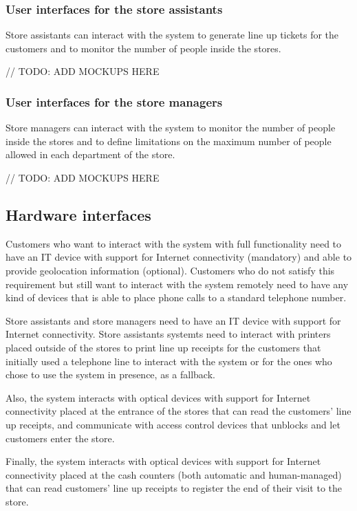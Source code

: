 \documentclass[../../main.tex]{subfiles}
\begin{document}
  \subsubsection{User interfaces for the store assistants}

  Store assistants can interact with the system to generate line up tickets for the customers and to monitor the number of people inside the stores.

  // TODO: ADD MOCKUPS HERE

  \subsubsection{User interfaces for the store managers}

  Store managers can interact with the system to monitor the number of people inside the stores and to define limitations on the maximum number of people allowed in each department of the store.

  // TODO: ADD MOCKUPS HERE

\subsection{Hardware interfaces}

Customers who want to interact with the system with full functionality need to have an IT device with support for Internet connectivity (mandatory) and able to provide geolocation information (optional). Customers who do not satisfy this requirement but still want to interact with the system remotely need to have any kind of devices that is able to place phone calls to a standard telephone number.

Store assistants and store managers need to have an IT device with support for Internet connectivity. Store assistants systemts need to interact with printers placed outside of the stores to print line up receipts for the customers that initially used a telephone line to interact with the system or for the ones who chose to use the system in presence, as a fallback.

Also, the system interacts with optical devices with support for Internet connectivity placed at the entrance of the stores that can read the customers' line up receipts, and communicate with access control devices that unblocks and let customers enter the store.

Finally, the system interacts with optical devices with support for Internet connectivity placed at the cash counters (both automatic and human-managed) that can read customers' line up receipts to register the end of their visit to the store.
\end{document}
